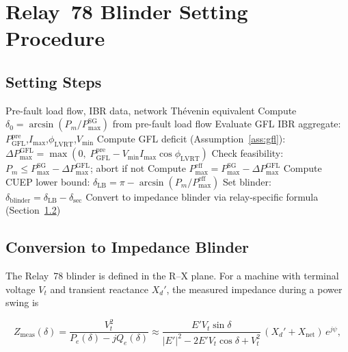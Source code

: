 \documentclass[11pt,a4paper]{article}
\newcommand{\dz}{\delta_0}         %
\newcommand{\dlb}{\delta_{\mathrm{LB}}}   %
\newcommand{\Pm}{P_m}
\newcommand{\PmaxSG}{P_{\max}^{\mathrm{SG}}}
\newcommand{\PmaxEff}{P_{\max}^{\mathrm{eff}}}
\begin{document}
\section{Relay~78 Blinder Setting Procedure}
\label{sec:relay78}

\subsection{Setting Steps}

\begin{algorithm}[H]
\caption{IBR-Corrected Relay~78 Blinder Setting (offline, per commissioning)}
\label{alg:relay78}
\begin{algorithmic}[1]
  \Require Pre-fault load flow, IBR data, network Th\'evenin equivalent
  \State Compute $\dz = \arcsin(\Pm/\PmaxSG)$ from pre-fault load flow
  \State Evaluate GFL IBR aggregate:
    $P_{\mathrm{GFL}}^{\mathrm{pre}}$,\;$I_{\max}$,\;$\phi_{\mathrm{LVRT}}$,\;$V_{\min}$
  \State Compute GFL deficit (Assumption~\ref{ass:gfl}):
    $\Delta P_{\max}^{\mathrm{GFL}} = \max(0,\;P_{\mathrm{GFL}}^{\mathrm{pre}}
    - V_{\min} I_{\max}\cos\phi_{\mathrm{LVRT}})$
  \State Check feasibility: $\Pm \leq \PmaxSG - \Delta P_{\max}^{\mathrm{GFL}}$; abort if not
  \State Compute $\PmaxEff = \PmaxSG - \Delta P_{\max}^{\mathrm{GFL}}$
  \State Compute CUEP lower bound:
    $\dlb = \pi - \arcsin\!\left(\Pm/\PmaxEff\right)$
  \State Set blinder: $\delta_{\mathrm{blinder}} = \dlb - \delta_{\mathrm{sec}}$
  \State Convert to impedance blinder via relay-specific formula
         (Section~\ref{sec:impedance})
\end{algorithmic}
\end{algorithm}

\subsection{Conversion to Impedance Blinder}
\label{sec:impedance}

The Relay~78 blinder is defined in the R--X plane.  For a machine with
terminal voltage $V_t$ and transient reactance $X_d'$, the measured
impedance during a power swing is

\begin{equation}
  Z_{\mathrm{meas}}(\delta) = \frac{V_t^2}{P_e(\delta) - jQ_e(\delta)}
  \approx
  \frac{E' V_t \sin\delta}{|E'|^2 - 2E'V_t\cos\delta + V_t^2}\,
  (X_d' + X_{\mathrm{net}})\,e^{j\psi},
  \label{eq:Z_swing}
\end{equation}
\end{document}
